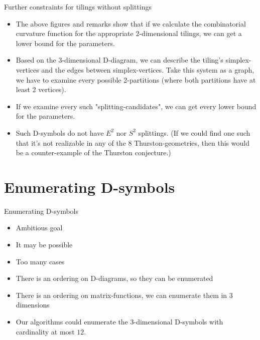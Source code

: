 \begin{frame}
  Further constraints for tilings without splittings
  \begin{itemize}
    \item The above figures and remarks show that if we calculate the
      combinatorial curvature function for the appropriate $2$-dimensional
      tilings, we can get a lower bound for the parameters.
    \item Based on the $3$-dimensional D-diagram, we can describe the tiling's
      simplex-vertices and the edges between simplex-vertices. Take this system
      as a graph, we have to examine every possible 2-partitions (where both
      partitions have at least 2 vertices).
    \item If we examine every such "splitting-candidates", we can get every
      lower bound for the parameters.
    \item Such D-symbols do not have $E^2$ nor $S^2$ splittings. (If we could
      find one such that it's not realizable in any of the 8
      Thurston-geometries, then this would be a counter-example of the Thurston
      conjecture.)
  \end{itemize}
\end{frame}


\section{Enumerating D-symbols}
\begin{frame}
  Enumerating D-symbols
  \begin{itemize}
    \item Ambitious goal
    \item It may be possible
    \item Too many cases
    \item There is an ordering on D-diagrams, so they can be enumerated
    \item There is an ordering on matrix-functions, we can enumerate them in $3$
      dimensions
    \item Our algorithms could enumerate the $3$-dimensional D-symbols with
      cardinality at most $12$.
  \end{itemize}
\end{frame}

